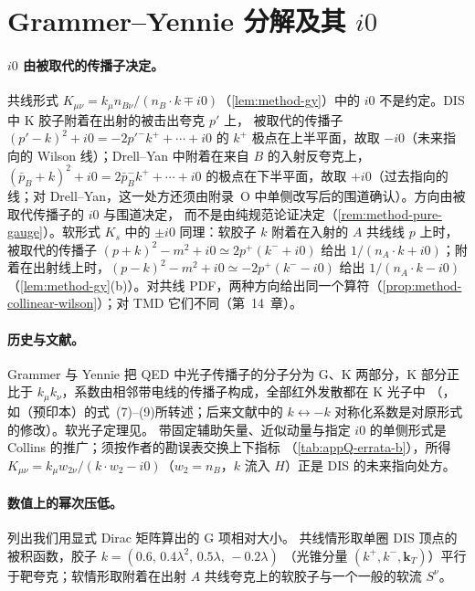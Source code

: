 \section{Grammer--Yennie 分解及其 \texorpdfstring{$i0$}{i0}}\label{sec:appF-gy}

\paragraph{$i0$ 由被取代的传播子决定。}共线形式 $K_{\mu\nu}=k_\mu n_{B\nu}/(n_B\cdot k\mp i0)$（\cref{lem:method-gy}）中的 $i0$ 不是约定。DIS 中 K 胶子附着在出射的被击出夸克 $p'$ 上，
被取代的传播子 $(p'-k)^2+i0=-2p'^-k^++\cdots+i0$ 的 $k^+$ 极点在上半平面，故取 $-i0$（未来指向的 Wilson 线）；Drell--Yan 中附着在来自 $B$ 的入射反夸克上，
$(\bar p_B+k)^2+i0=2\bar p_B^-k^++\cdots+i0$ 的极点在下半平面，故取 $+i0$（过去指向的线；对 Drell--Yan，这一处方还须由附录~O 中单侧改写后的围道确认）。方向由被取代传播子的 $i0$ 与围道决定，
而不是由纯规范论证决定（\cref{rem:method-pure-gauge}）。软形式 $K_s$ 中的 $\pm i0$ 同理：软胶子 $k$ 附着在入射的 $A$ 共线线 $p$ 上时，被取代的传播子 $(p+k)^2-m^2+i0\simeq2p^+(k^-+i0)$ 给出 $1/(n_A\cdot k+i0)$；附着在出射线上时，$(p-k)^2-m^2+i0\simeq-2p^+(k^--i0)$ 给出 $1/(n_A\cdot k-i0)$（\cref{lem:method-gy}(b)）。对共线 PDF，两种方向给出同一个算符（\cref{prop:method-collinear-wilson}）；对 TMD 它们不同（第~14~章）。

\paragraph{历史与文献。}Grammer 与 Yennie 把 QED 中光子传播子的分子分为 G、K 两部分，K 部分正比于 $k_\mu k_\nu$，系数由相邻带电线的传播子构成，全部红外发散都在 K 光子中
（\cite{GrammerYennie1973}，如\cite{SenIndumathiChoudhury2019}（预印本）的式~(7)--(9)所转述；后来文献中的 $k\leftrightarrow-k$ 对称化系数是对原形式的修改）。软光子定理见\cite{Weinberg1965}。
带固定辅助矢量、近似动量与指定 $i0$ 的单侧形式是 Collins 的推广\cite[第~5.5.6、10.6、11.9.3~节]{Collins2011}；\cite[式~(11.4)--(11.6)]{Collins2011}须按作者的勘误表交换上下指标
（\cref{tab:appQ-errata-b}），所得 $K_{\mu\nu}=k_\mu w_{2\nu}/(k\cdot w_2-i0)$（$w_2=n_B$，$k$ 流入 $H$）正是 DIS 的未来指向处方。

\paragraph{数值上的幂次压低。}列出我们用显式 Dirac 矩阵算出的 G 项相对大小。%
共线情形取单圈 DIS 顶点的被积函数，胶子 $k=(0.6,\,0.4\lambda^2,\,0.5\lambda,\,-0.2\lambda)$
（光锥分量 $(k^+,k^-,\mathbf k_T)$）平行于靶夸克；软情形取附着在出射 $A$ 共线夸克上的软胶子与一个一般的软流 $S^\nu$。

